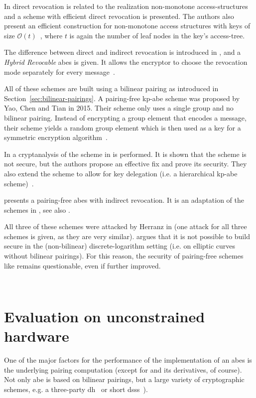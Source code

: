 In \cite{lewko_revocation_2008} direct revocation is related to the realization non-monotone \glspl{access-structure} and a scheme with efficient direct revocation is presented.
The authors also present an efficient construction for non-monotone access structures with keys of size $\mathcal{O}(t)$~\cite{lewko_revocation_2008}, where $t$ is again the number of leaf nodes in the key's \gls{access-tree}.

The difference between direct and indirect revocation is introduced in \cite{attrapadung_attribute-based_2009}, and a \emph{Hybrid Revocable} \acrshort{abes} is given.
It allows the encryptor to choose the revocation mode separately for every message~\cite{attrapadung_attribute-based_2009}.

All of these schemes are built using a bilinear pairing as introduced in Section~\ref{sec:bilinear-pairings}.
A pairing-free \acrshort{kp-abe} scheme was proposed by Yao, Chen and Tian \cite{yao_lightweight_2015} in 2015.
Their scheme only uses a single group and no bilinear pairing.
Instead of encrypting a group element that encodes a message, their scheme yields a random group element which is then used as a key for a symmetric encryption algorithm~\cite{yao_lightweight_2015}.

In \cite{tan_enhancement_2019} a cryptanalysis of the scheme in \cite{yao_lightweight_2015} is performed.
It is shown that the scheme is not secure, but the authors propose an effective fix and prove its security.
They also extend the scheme to allow for key delegation (i.e. a hierarchical \acrshort{kp-abe} scheme)~\cite{tan_enhancement_2019}.

\cite{sowjanya_efficient_2020} presents a pairing-free \acrshort{abes} with indirect revocation.
It is an adaptation of the schemes in \cite{yao_lightweight_2015,tan_enhancement_2019}, see also \cite{herranz_attacking_2020}.

All three of these schemes were attacked by Herranz in \cite{herranz_attacking_2020} (one attack for all three schemes is given, as they are very similar).
\cite{herranz_attacking_2020} argues that it is not possible to build secure  in the (non-bilinear) discrete-logarithm setting (i.e. on elliptic curves without bilinear pairings).
For this reason, the security of pairing-free schemes like \cite{yao_lightweight_2015,sowjanya_efficient_2020,tan_enhancement_2019} remains questionable, even if further improved.

~

\section{Evaluation on unconstrained hardware}
One of the major factors for the performance of the implementation of an \acrshort{abes} is the underlying pairing computation (except for \cite{yao_lightweight_2015} and its derivatives, of course).
Not only \acrshort{abe} is based on bilinear pairings, but a large variety of cryptographic schemes, e.g. a three-party \gls{dh}~\cite{joux_one_2000} or short \glspl{dss}~\cite{boneh_short_2001}).

